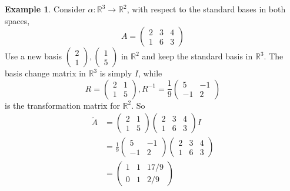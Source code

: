 \documentclass[a4paper]{article}
\theoremstyle{definition}
\newtheorem*{eg}{Example}
\newcommand{\R}{\mathbb{R}}
\begin{document}
\begin{eg}
  Consider $\alpha: \R^3 \to \R^2$, with respect to the standard bases in both spaces,
  \[
  A = 
  \begin{pmatrix}
    2 & 3 & 4\\
    1 & 6 & 3
  \end{pmatrix}
  \]
  Use a new basis $
  \begin{pmatrix}
    2\\1
  \end{pmatrix}, 
  \begin{pmatrix}
    1\\5
  \end{pmatrix}$ in $\R^2$ and keep the standard basis in $\R^3$. The basis change matrix in $\R^3$ is simply $I$, while
  \[
  R = 
  \begin{pmatrix}
    2& 1\\
    1 & 5
  \end{pmatrix}, R^{-1} = \frac{1}{9}
  \begin{pmatrix}
    5 & -1\\
    -1 & 2
  \end{pmatrix}
  \]
  is the transformation matrix for $\R^2$. So
  \begin{align*}
    \tilde{A} &= 
    \begin{pmatrix}
      2 & 1\\1 & 5
    \end{pmatrix}
    \begin{pmatrix}
      2 & 3 & 4\\1 & 6 & 3
    \end{pmatrix}I\\
    &= \frac{1}{9}
    \begin{pmatrix}
      5 & -1\\
      -1 & 2
    \end{pmatrix}
    \begin{pmatrix}
      2 & 3 & 4\\1 & 6 & 3
    \end{pmatrix}\\
    &= 
    \begin{pmatrix}
      1 & 1 & 17/9\\
      0 & 1 & 2/9
    \end{pmatrix}
  \end{align*}


\end{eg}
\end{document}
